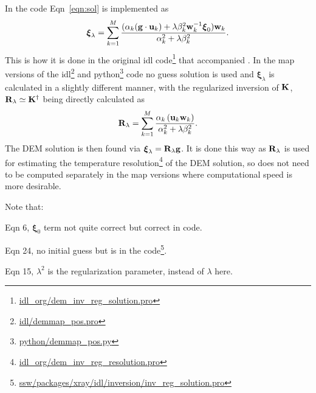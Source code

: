\documentclass[12pt,a4paper]{article}
\newenvironment{itemize*}
{\begin{itemize} \setlength{\itemsep}{0pt} \setlength{\parskip}{0pt}}
{\end{itemize}}
\begin{document}
In the code Eqn~\ref{eqn:sol} is implemented as
\begin{equation}\label{eqn:solcode}
 \boldsymbol{\xi}_\lambda =\sum_{k=1}^ M\frac{\left(\alpha_k({\bf g}\cdot {\bf u}_k\right)+\lambda\beta_k^2{\bf w}_k^{-1}\boldsymbol{\xi}_0){\bf w}_k}{\alpha_k^2 + \lambda\beta_k^2}.
\end{equation}
This is how it is done in the original idl code\footnote{\href{https://github.com/ianan/demreg/blob/master/idl_org/dem_inv_reg_solution.pro}{idl\_org/dem\_inv\_reg\_solution.pro}} that accompanied \citet{2012A&A...539A.146H}. In the map versions \citep{2013A&A...553A..10H} of the idl\footnote{\href{https://github.com/ianan/demreg/blob/261a85156c5a91c77cdc55750c58d0f0dfc7be07/idl/demmap_pos.pro}{idl/demmap\_pos.pro}} and python\footnote{\href{https://github.com/ianan/demreg/blob/261a85156c5a91c77cdc55750c58d0f0dfc7be07/python/demmap_pos.py}{python/demmap\_pos.py}} code no guess solution is used and $\boldsymbol{\xi}_\lambda$ is calculated in a slightly different manner, with the regularized inversion of ${\bf K}$, ${\bf R_\lambda \simeq K^\dag}$ being directly calculated as
\begin{equation}\label{eqn:solmapcode}
 {\bf R}_\lambda =\sum_{k=1}^ M\frac{\alpha_k\left({\bf u}_k {\bf w}_k\right)}{\alpha_k^2 + \lambda\beta_k^2}.
\end{equation}
The DEM solution is then found via $\boldsymbol{\xi}_\lambda = {\bf R}_\lambda {\bf g}$. It is done this way as ${\bf R_\lambda}$ is used for estimating the temperature resolution\footnote{\href{https://github.com/ianan/demreg/blob/master/idl_org/dem_inv_reg_resolution.pro}{idl\_org/dem\_inv\_reg\_resolution.pro}} of the DEM solution, so does not need to be computed separately in the map versions where computational speed is more desirable.

Note that:
\begin{itemize*}
\vspace{-5pt}
    \item \cite{2012A&A...539A.146H} Eqn 6, $\boldsymbol{\xi}_0$ term not quite correct but correct in code.
    \item \cite{2004SoPh..225..293K} Eqn 24, no initial guess but is in the code\footnote{\href{https://hesperia.gsfc.nasa.gov/ssw/packages/xray/idl/inversion/inv_reg_solution.pro}{ssw/packages/xray/idl/inversion/inv\_reg\_solution.pro}}.
    \item \citet{1992InvPr...8..849H} Eqn 15, $\lambda^2$ is the regularization parameter, instead of $\lambda$ here.
\end{itemize*} 
\end{document}
